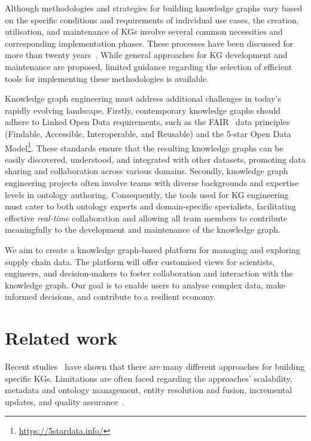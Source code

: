 \documentclass[
hf
]{ceurart}
\begin{document}
Although methodologies and strategies for building knowledge graphs vary based on the specific conditions and requirements of individual use cases, the creation, utilisation, and maintenance of KGs involve several common necessities and corresponding implementation phases. These processes have been discussed for more than twenty years~\cite{Gruninger1995-MethodologyFT, Noy2001-Ontology101, SurezFigueroa2012-TheNeonMethodology, Auer2012-lod-life-cycle}. While general approaches for KG development and maintenance are proposed, limited guidance regarding the selection of efficient tools for implementing these methodologies is available.

Knowledge graph engineering must address additional challenges in today's rapidly evolving landscape. Firstly, contemporary knowledge graphs should adhere to Linked Open Data requirements, such as the FAIR~\cite{wilkinson2016fair} data principles (Findable, Accessible, Interoperable, and Reusable) and the 5-star Open Data Model\footnote{\url{https://5stardata.info/}}. These standards ensure that the resulting knowledge graphs can be easily discovered, understood, and integrated with other datasets, promoting data sharing and collaboration across various domains. Secondly, knowledge graph engineering projects often involve teams with diverse backgrounds and expertise levels in ontology authoring. Consequently, the tools used for KG engineering must cater to both ontology experts and domain-specific specialists, facilitating effective \emph{real-time} collaboration and allowing all team members to contribute meaningfully to the development and maintenance of the knowledge graph.

We aim to create a knowledge graph-based platform for managing and exploring supply chain data. The platform will offer customised views for scientists, engineers, and decision-makers to foster collaboration and interaction with the knowledge graph. Our goal is to enable users to analyse complex data, make informed decisions, and contribute to a resilient economy.



\section{Related work}

Recent studies~\cite{Hur2021, hitzler_review_2021, zhu_multi-modal_2022, ryen_building_2022, tamasauskaite_defining_2023} have shown that there are many different approaches for building specific KGs. Limitations are often faced regarding the approaches' scalability, metadata and ontology management, entity resolution and fusion, incremental updates, and quality assurance~\cite{Hofer2023}. 
\end{document}

